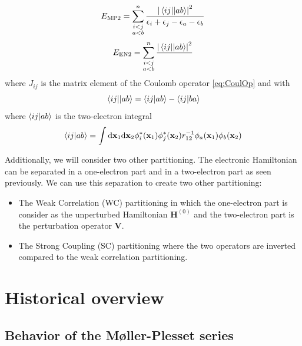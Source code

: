 \documentclass[11pt,a4paper]{article}
\newcommand{\bH}{\mathbf{H}}
\newcommand{\bV}{\mathbf{V}}
\begin{document}
\begin{equation}\label{eq:EMP2}
E_{\text{MP2}}=\sum\limits_{\substack{i<j \\ a<b}}^{n}\frac{\abs{\mel{ij}{}{ab}}^2}{\epsilon_i + \epsilon_j - \epsilon_a - \epsilon_b}
\end{equation}
\begin{equation}\label{eq:EEN2}
E_{\text{EN2}}=\sum\limits_{\substack{i<j \\ a<b}}^{n}\frac{\abs{\mel{ij}{}{ab}}^2}{}
\end{equation}
where $J_{ij}$ is the matrix element of the Coulomb operator \eqref{eq:CoulOp} and with
\begin{equation}
	\mel{ij}{}{ab}=\braket{ij}{ab} - \braket{ij}{ba}
\end{equation}
where $\braket{ij}{ab}$ is the two-electron integral
\begin{equation}
\braket{ij}{ab}=\int \dd\vb{x}_1\dd\vb{x}_2\phi_i^*(\vb{x}_1)\phi_j^*(\vb{x}_2)r_{12}^{-1}\phi_a(\vb{x}_1)\phi_b(\vb{x}_2)
\end{equation}

Additionally, we will consider two other partitioning. The electronic Hamiltonian can be separated in a one-electron part and in a two-electron part as seen previously. We can use this separation to create two other partitioning:

\begin{itemize}
\item The Weak Correlation (WC) partitioning in which the one-electron part is consider as the unperturbed Hamiltonian $\bH^{(0)}$ and the two-electron part is the perturbation operator $\bV$.
\item The Strong Coupling (SC) partitioning where the two operators are inverted compared to the weak correlation partitioning.
\end{itemize}

\section{Historical overview}

\subsection{Behavior of the M{\o}ller-Plesset series}
\end{document}
